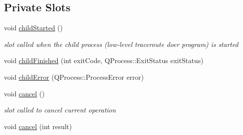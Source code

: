 \subsection*{Private Slots}
\begin{CompactItemize}
\item 
\hypertarget{classTrDo_b5ea9400b92cf70bf0fba87f66a6f86d}{
void \hyperlink{classTrDo_b5ea9400b92cf70bf0fba87f66a6f86d}{childStarted} ()}
\label{classTrDo_b5ea9400b92cf70bf0fba87f66a6f86d}

\begin{CompactList}\small\item\em slot called when the child process (low-level traceroute doer program) is started \item\end{CompactList}\item 
void \hyperlink{classTrDo_4a43dbd440bd3dcbf747be138086b293}{childFinished} (int exitCode, QProcess::ExitStatus exitStatus)
\item 
void \hyperlink{classTrDo_f2fb422e879258efaca94280f849b3dc}{childError} (QProcess::ProcessError error)
\item 
\hypertarget{classTrDo_dc3766e45ba34158d1da99c96bc7d055}{
void \hyperlink{classTrDo_dc3766e45ba34158d1da99c96bc7d055}{cancel} ()}
\label{classTrDo_dc3766e45ba34158d1da99c96bc7d055}

\begin{CompactList}\small\item\em slot called to cancel current operation \item\end{CompactList}\item 
void \hyperlink{classTrDo_f4e4e8f6848183014a157605bc9c402a}{cancel} (int result)
\end{CompactItemize}
